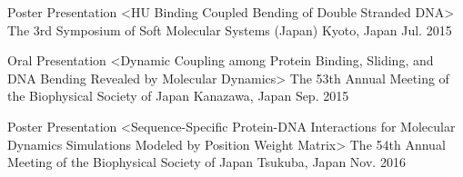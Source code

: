 

\begin{cventries}

  \cventry
    {Poster Presentation <HU Binding Coupled Bending of Double Stranded DNA>} %
    {The 3rd Symposium of Soft Molecular Systems (Japan)} %
    {Kyoto, Japan} %
    {Jul. 2015} %

  \cventry
    {Oral Presentation <Dynamic Coupling among Protein Binding, Sliding, and DNA Bending Revealed by Molecular Dynamics>} %
    {The 53th Annual Meeting of the Biophysical Society of Japan} %
    {Kanazawa, Japan} %
    {Sep. 2015} %
    {}

  \cventry
    {Poster Presentation <Sequence-Specific Protein-DNA Interactions for
      Molecular Dynamics Simulations Modeled by Position Weight Matrix>} %
    {The 54th Annual Meeting of the Biophysical Society of Japan} %
    {Tsukuba, Japan} %
    {Nov. 2016} %

\end{cventries}
